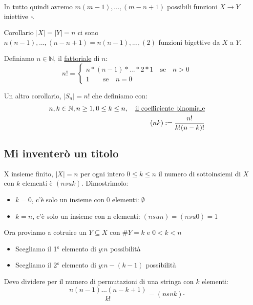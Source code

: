 \documentclass{article}
\theoremstyle{definition}
\begin{document}
In tutto quindi avremo $m(m-1),\ldots,(m-n+1)$ possibili funzioni $X \to Y$ iniettive $\square$. \par

Corollario $|X| = |Y| = n$ ci sono $n(n-1),\ldots,(n-n+1) = n(n-1),\ldots,(2)$ funzioni bigettive da $X$ a $Y$. \par
Definiamo $n \in \mathbb{N}$, il \underline{fattoriale} di $n$:
\[ n! = 
\begin{cases}
        n * (n-1) * \ldots * 2 * 1 \quad \mbox{se} \quad n>0\\
        1 \quad \quad \mbox{se} \quad n = 0
\end{cases}
\]

Un altro corollario, $|S_n| = n$! che definiamo con:
\begin{align*}
        n,k \in \mathbb{N}, n \ge 1, 0 \le k \le n, \quad \mbox{\underline{il coefficiente binomiale}} \\
        (n k) := \frac{n!}{k!(n-k)!}
\end{align*}




\subsection{Mi inventerò un titolo}
X insieme finito, $|X| = n$ per ogni intero $0 \le k \le n$ il numero di sottoinsiemi di $X$ con $k$ elementi è $(n su k)$.
Dimostrimolo:
\begin{itemize}
        \item $k=0$, c'è solo un insieme con 0 elementi: $\emptyset$
        \item $k=n$, c'è solo un insieme con n elementi: $(n su n) = (n su 0) = 1$
\end{itemize}

Ora proviamo a cotruire un $Y \subseteq X$ con $\#Y = k$ e $0 < k < n$ \par
\begin{itemize}
        \item Scegliamo il 1° elemento di $y$:$n$ possibilità
        \item Scegliamo il 2° elemento di $y$:$n-(k-1)$ possibilità
\end{itemize}

Devo dividere per il numero di permutazioni di una stringa con $k$ elementi:
\begin{equation*}
        \frac{n(n-1)\ldots(n-k+1)}{k!} = (n su k) \square
\end{equation*}
\end{document}
